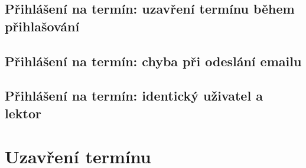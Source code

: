 \documentclass[12pt,a4paper,titlepage,final]{report}
\begin{document}
\subsection{Přihlášení na termín: uzavření termínu během přihlašování}

\subsection{Přihlášení na termín: chyba při odeslání emailu}

\subsection{Přihlášení na termín: identický uživatel a lektor}

\section{Uzavření termínu}
\end{document}
